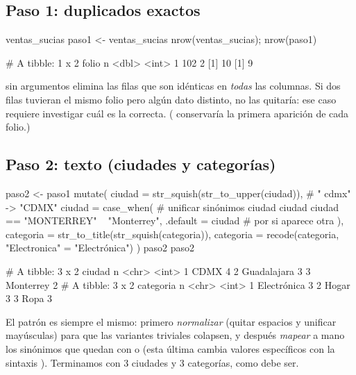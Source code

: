 \subsection{Paso 1: duplicados exactos}

\begin{rcode}
ventas_sucias %
paso1 <- ventas_sucias %
nrow(ventas_sucias); nrow(paso1)
\end{rcode}
\begin{rsalida}
# A tibble: 1 x 2
  folio     n
  <dbl> <int>
1   102     2
[1] 10
[1] 9
\end{rsalida}

 sin argumentos elimina las filas que son idénticas en
\emph{todas} las columnas. Si dos filas tuvieran el mismo folio pero algún
dato distinto, no las quitaría: ese caso requiere investigar cuál es la
correcta. ( conservaría la
primera aparición de cada folio.)

\subsection{Paso 2: texto (ciudades y categorías)}

\begin{rcode}
paso2 <- paso1 %
  mutate(
    ciudad = str_squish(str_to_upper(ciudad)),     # " cdmx" -> "CDMX"
    ciudad = case_when(                            # unificar sinónimos
      ciudad %
      ciudad %
      ciudad == "MONTERREY"                 ~ "Monterrey",
      .default = ciudad                     # por si aparece otra
    ),
    categoria = str_to_title(str_squish(categoria)),
    categoria = recode(categoria, "Electronica" = "Electrónica")
  )
paso2 %
paso2 %
\end{rcode}
\begin{rsalida}
# A tibble: 3 x 2
  ciudad          n
  <chr>       <int>
1 CDMX            4
2 Guadalajara     3
3 Monterrey       2
# A tibble: 3 x 2
  categoria       n
  <chr>       <int>
1 Electrónica     3
2 Hogar           3
3 Ropa            3
\end{rsalida}

El patrón es siempre el mismo: primero \emph{normalizar} (quitar espacios y
unificar mayúsculas) para que las variantes triviales colapsen, y después
\emph{mapear} a mano los sinónimos que quedan con  o
 (esta última cambia valores específicos con la sintaxis
). Terminamos con 3 ciudades y 3 categorías, como
debe ser.


